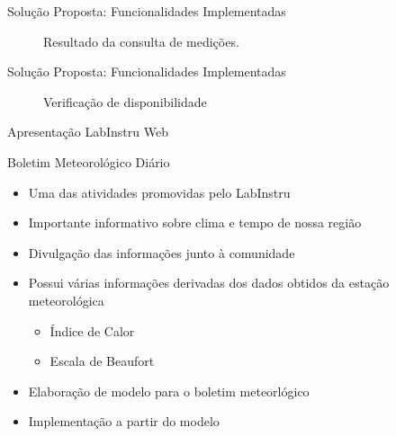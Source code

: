 \begin{frame}{Solução Proposta: Funcionalidades Implementadas}
\begin{figure}[h!]
\centering
{}
\caption{Resultado da consulta de medições.}
\end{figure}
\end{frame}

\begin{frame}{Solução Proposta: Funcionalidades Implementadas}
\begin{figure}[h!]
\centering
{}
\caption{Verificação de disponibilidade}
\end{figure}
\end{frame}

\begin{frame}{Apresentação LabInstru Web}
	\begin{center}
	\end{center}
\end{frame}

\begin{frame}{Boletim Meteorológico Diário}
\begin{itemize}
	\item Uma das atividades promovidas pelo LabInstru
	\item Importante informativo sobre clima e tempo de nossa região
  \item Divulgação das informações junto à comunidade
	\item Possui várias informações derivadas dos dados obtidos da estação meteorológica
	\begin{itemize}
		\item Índice de Calor
		\item Escala de Beaufort
	\end{itemize}
	\item Elaboração de modelo para o boletim meteorlógico
	\item Implementação a partir do modelo
\end{itemize}
\end{frame}

